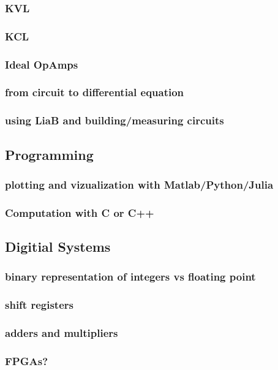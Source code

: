 \subsubsection*{KVL}

\subsubsection*{KCL}

\subsubsection*{Ideal OpAmps}

\subsubsection*{from circuit to differential equation}

\subsubsection*{using LiaB and building/measuring circuits}

\subsection*{Programming}

\subsubsection*{plotting and vizualization with Matlab/Python/Julia}

\subsubsection*{Computation with C or C++}

\subsection*{Digitial Systems}

\subsubsection*{binary representation of integers vs floating point}

\subsubsection*{shift registers}

\subsubsection*{adders and multipliers}

\subsubsection*{FPGAs?}
